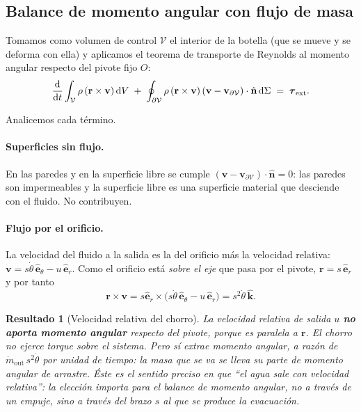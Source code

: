 \documentclass[11pt,a4paper]{article}
\newcommand{\dd}{\mathrm{d}}
\newtheorem{resultado}{Resultado}
\begin{document}
\subsection{Balance de momento angular con flujo de masa}

Tomamos como volumen de control $\mathcal V$ el interior de la botella (que se mueve y se deforma
con ella) y aplicamos el teorema de transporte de Reynolds al momento angular respecto del pivote
fijo $O$:
\begin{equation}
\frac{\dd}{\dd t}\int_{\mathcal V}\rho\,(\mathbf r\times\mathbf v)\,\dd V
\;+\;\oint_{\partial\mathcal V}\rho\,(\mathbf r\times\mathbf v)\,
(\mathbf v-\mathbf v_{\partial\mathcal V})\cdot\hat{\mathbf n}\,\dd \Sigma
\;=\;\boldsymbol\tau_{\rm ext}.
\label{eq:reynolds}
\end{equation}

Analicemos cada término.

\paragraph{Superficies sin flujo.} En las paredes y en la superficie libre se cumple
$(\mathbf v-\mathbf v_{\partial\mathcal V})\cdot\hat{\mathbf n}=0$: las paredes son impermeables y
la superficie libre es una superficie material que desciende con el fluido. No contribuyen.

\paragraph{Flujo por el orificio.} La velocidad del fluido a la salida es la del orificio más la
velocidad relativa: $\mathbf v = s\dot\theta\,\hat{\mathbf e}_\theta - u\,\hat{\mathbf e}_r$.
Como el orificio está \emph{sobre el eje} que pasa por el pivote, $\mathbf r = s\,\hat{\mathbf e}_r$
y por tanto
\begin{equation}
\mathbf r\times\mathbf v = s\hat{\mathbf e}_r\times
\big(s\dot\theta\,\hat{\mathbf e}_\theta - u\,\hat{\mathbf e}_r\big) = s^2\dot\theta\,\hat{\mathbf k}.
\end{equation}

\begin{resultado}[Velocidad relativa del chorro]
La velocidad relativa de salida $u$ \textbf{no aporta momento angular} respecto del pivote, porque
es paralela a $\mathbf r$. El chorro no ejerce torque sobre el sistema. Pero sí \emph{extrae}
momento angular, a razón de $\dot m_{\text{out}}\,s^2\dot\theta$ por unidad de tiempo:
la masa que se va se lleva su parte de momento angular de arrastre. Éste es el sentido preciso en
que ``el agua sale con velocidad relativa'': la elección importa para el balance de momento
angular, no a través de un empuje, sino a través del \emph{brazo} $s$ al que se produce la
evacuación.
\end{resultado}
\end{document}
